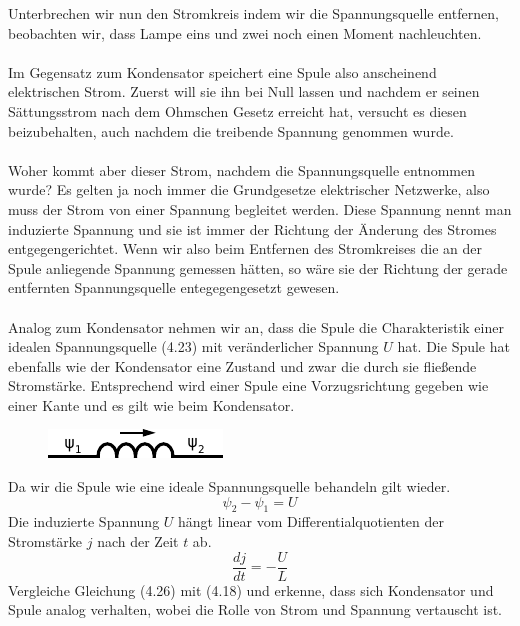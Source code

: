 \documentclass[11pt,a4paper,leqno]{report}
\numberwithin{equation}{chapter}
\begin{document}
Unterbrechen wir nun den Stromkreis indem wir die Spannungsquelle entfernen, beobachten wir, dass Lampe eins und zwei noch einen Moment nachleuchten.\\
\\
Im Gegensatz zum Kondensator speichert eine Spule also anscheinend elektrischen Strom. Zuerst will sie ihn bei Null lassen und nachdem er seinen S\"attungsstrom nach dem Ohmschen Gesetz erreicht hat, versucht es diesen beizubehalten, auch nachdem die treibende Spannung genommen wurde.
\\
\\
Woher kommt aber dieser Strom, nachdem die Spannungsquelle entnommen wurde? Es gelten ja noch immer die Grundgesetze elektrischer Netzwerke, also muss der Strom von einer Spannung begleitet werden. Diese Spannung nennt man induzierte Spannung und sie ist immer der Richtung der \"Anderung des Stromes entgegengerichtet. Wenn wir also beim Entfernen des Stromkreises die an der Spule anliegende Spannung gemessen h\"atten, so w\"are sie der Richtung der gerade entfernten Spannungsquelle entegegengesetzt gewesen.\\
\\
Analog zum Kondensator nehmen wir an, dass die Spule die Charakteristik einer idealen Spannungsquelle (4.23) mit ver\"anderlicher Spannung $U$ hat. Die Spule hat ebenfalls wie der Kondensator eine Zustand und zwar die durch sie flie\ss{}ende Stromst\"arke.
Entsprechend wird einer Spule eine Vorzugsrichtung gegeben wie einer Kante und es gilt wie beim Kondensator.
  \begin{figure}[H]
	\begin{center}
		\includegraphics[scale=1.5]{Bilder/spule_direkt.pdf}
	\end{center}
\end{figure}
\noindent
Da wir die Spule wie eine ideale Spannungsquelle behandeln gilt wieder.
\begin{equation*}
\psi_2 - \psi_1 = U
\end{equation*}
Die induzierte Spannung $U$ h\"angt linear vom Differentialquotienten der Stromst\"arke $j$ nach der Zeit $t$ ab.
 \begin{equation}
\frac{dj}{dt} = -\frac{U}{L} 
\end{equation}
\noindent
Vergleiche Gleichung (4.26) mit (4.18) und erkenne, dass sich Kondensator und Spule analog verhalten, wobei die Rolle von Strom und Spannung vertauscht ist.\\
\end{document}
